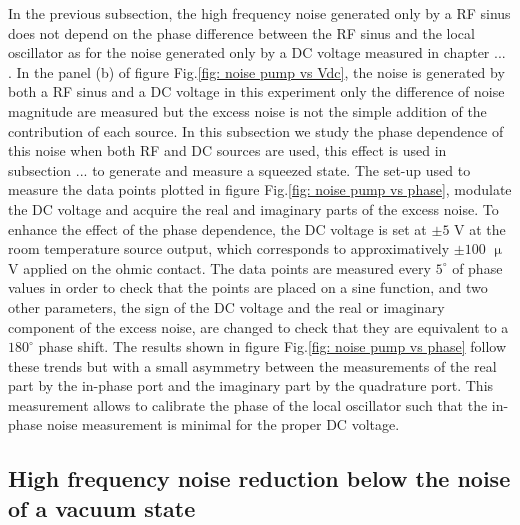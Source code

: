 In the previous subsection, the high frequency noise generated only by a RF sinus does not depend on the phase difference between the RF sinus and the local oscillator as for the noise generated only by a DC voltage measured in chapter ... .
In the panel (b) of figure Fig.\ref{fig: noise pump vs Vdc}, the noise is generated by both a RF sinus and a DC voltage in this experiment only the difference of noise magnitude are measured but the excess noise is not the simple addition of the contribution of each source.
In this subsection we study the phase dependence of this noise when both RF and DC sources are used, this effect is used in subsection ... to generate and measure a squeezed state.
The set-up used to measure the data points plotted in figure Fig.\ref{fig: noise pump vs phase}, modulate the DC voltage and acquire the real and imaginary parts of the excess noise.
To enhance the effect of the phase dependence, the DC voltage is set at $\pm5$ V at the room temperature source output, which corresponds to approximatively $\pm100$ $\upmu$V applied on the ohmic contact.
The data points are measured every $5^\circ$ of phase values in order to check that the points are placed on a sine function, and two other parameters, the sign of the DC voltage and the real or imaginary component of the excess noise, are changed to check that they are equivalent to a $180^\circ$ phase shift.
The results shown in figure Fig.\ref{fig: noise pump vs phase} follow these trends but with a small asymmetry between the measurements of the real part by the in-phase port and the imaginary part by the quadrature port.  
This measurement allows to calibrate the phase of the local oscillator such that the in-phase noise measurement is minimal for the proper DC voltage.

\subsection{High frequency noise reduction below the noise of a vacuum state}

